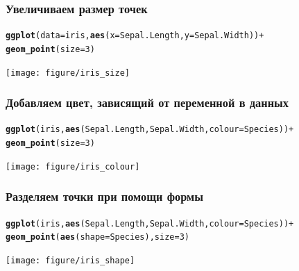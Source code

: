 \documentclass[compress]{beamer}\usepackage[]{graphicx}\usepackage[]{color}
\makeatletter
\newcommand{\hlnum}[1]{\textcolor[rgb]{0.686,0.059,0.569}{#1}}%
\newcommand{\hlopt}[1]{\textcolor[rgb]{0,0,0}{#1}}%
\newcommand{\hlstd}[1]{\textcolor[rgb]{0.345,0.345,0.345}{#1}}%
\newcommand{\hlkwc}[1]{\textcolor[rgb]{0.333,0.667,0.333}{#1}}%
\newcommand{\hlkwd}[1]{\textcolor[rgb]{0.737,0.353,0.396}{\textbf{#1}}}%
\newenvironment{kframe}{%
 \def\at@end@of@kframe{}%
 \ifinner\ifhmode%
  \def\at@end@of@kframe{\end{minipage}}%
  \begin{minipage}{\columnwidth}%
 \fi\fi%
 \def\FrameCommand##1{\hskip\@totalleftmargin \hskip-\fboxsep
 \colorbox{shadecolor}{##1}\hskip-\fboxsep
     \hskip-\linewidth \hskip-\@totalleftmargin \hskip\columnwidth}%
 \MakeFramed {\advance\hsize-\width
   \@totalleftmargin\z@ \linewidth\hsize
   \@setminipage}}%
 {\par\unskip\endMakeFramed%
 \at@end@of@kframe}
\newenvironment{knitrout}{}{} %
\makeatother
\begin{document}
\begin{frame}[fragile]
\frametitle{Увеличиваем размер точек}
\begin{knitrout}\footnotesize
{}\color{fgcolor}\begin{kframe}
\begin{alltt}
\hlkwd{ggplot}\hlstd{(}\hlkwc{data} \hlstd{= iris,} \hlkwd{aes}\hlstd{(}\hlkwc{x} \hlstd{= Sepal.Length,} \hlkwc{y} \hlstd{= Sepal.Width))} \hlopt{+}
  \hlkwd{geom_point}\hlstd{(}\hlkwc{size} \hlstd{=} \hlnum{3}\hlstd{)}
\end{alltt}
\end{kframe}
\texttt{[image: figure/iris\_size]} 

\end{knitrout}

\end{frame}

\begin{frame}[fragile]
\frametitle{Добавляем цвет, зависящий от переменной в данных}
\begin{knitrout}\footnotesize
{}\color{fgcolor}\begin{kframe}
\begin{alltt}
\hlkwd{ggplot}\hlstd{(iris,} \hlkwd{aes}\hlstd{(Sepal.Length, Sepal.Width,} \hlkwc{colour} \hlstd{= Species))} \hlopt{+}
  \hlkwd{geom_point}\hlstd{(}\hlkwc{size} \hlstd{=} \hlnum{3}\hlstd{)}
\end{alltt}
\end{kframe}
\texttt{[image: figure/iris\_colour]} 

\end{knitrout}

\end{frame}

\begin{frame}[fragile]
\frametitle{Разделяем точки при помощи формы}
\begin{knitrout}\footnotesize
{}\color{fgcolor}\begin{kframe}
\begin{alltt}
\hlkwd{ggplot}\hlstd{(iris,} \hlkwd{aes}\hlstd{(Sepal.Length, Sepal.Width,} \hlkwc{colour} \hlstd{= Species))} \hlopt{+}
  \hlkwd{geom_point}\hlstd{(}\hlkwd{aes}\hlstd{(}\hlkwc{shape} \hlstd{= Species),} \hlkwc{size} \hlstd{=} \hlnum{3}\hlstd{)}
\end{alltt}
\end{kframe}
\texttt{[image: figure/iris\_shape]} 

\end{knitrout}

\end{frame}
\end{document}
